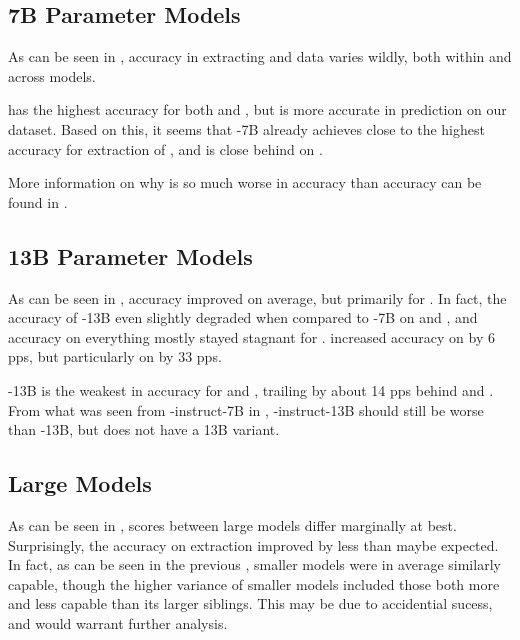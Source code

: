\subsection{7B Parameter Models}\label{sub:result:7b}
As can be seen in , accuracy in extracting \ttemp and \ttime data varies wildly, both within and across models.

 has the highest accuracy for both \ttemp and \ttime, but  is more accurate in \tsolv prediction on our dataset.
Based on this, it seems that -7B already achieves close to the highest accuracy for extraction of \ttemp, and is close behind on \ttime.

More information on why  is so much worse in \ttime accuracy than \ttemp accuracy can be found in .


\subsection{13B Parameter Models}\label{sub:result:13b}

As can be seen in , accuracy improved on average, but primarily for .
In fact, the accuracy of -13B even slightly degraded when compared to -7B on \ttemp and \ttime, and accuracy on everything mostly stayed stagnant for .
 increased accuracy on \ttemp by 6 \glspl{pp}, but particularly on \ttime by 33 \glspl{pp}.

-13B is the weakest in accuracy for \ttemp and \ttime, trailing by about 14 \glspl{pp} behind  and .
From what was seen from -instruct-7B in , -instruct-13B should still be worse than -13B, but  does not have a 13B variant.

\subsection{Large Models}\label{sub:result:large}
As can be seen in , scores between large models differ marginally at best.
Surprisingly, the accuracy on \tsolv extraction improved by less than maybe expected.
In fact, as can be seen in the previous , smaller models were in average similarly capable, though the higher variance of smaller models included those both more and less capable than its larger siblings.
This may be due to accidential sucess, and would warrant further analysis.





